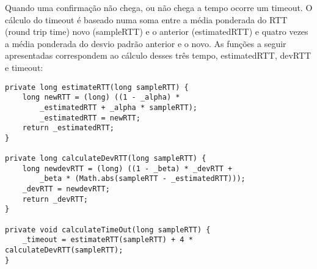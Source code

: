 \documentclass{article}
\begin{document}
Quando uma confirmação não chega, ou não chega a tempo ocorre um timeout. 
O cálculo do timeout é baseado numa soma entre a média ponderada do RTT (round trip time) novo (sampleRTT) e o anterior (estimatedRTT) e quatro vezes a média ponderada do desvio padrão anterior e o novo.
As funções a seguir apresentadas correspondem ao cálculo desses três tempo, estimatedRTT, devRTT e timeout:

\begin{lstlisting}
private long estimateRTT(long sampleRTT) {
	long newRTT = (long) ((1 - _alpha) * 
		_estimatedRTT + _alpha * sampleRTT);
		_estimatedRTT = newRTT;
	return _estimatedRTT;
}

private long calculateDevRTT(long sampleRTT) {
	long newdevRTT = (long) ((1 - _beta) * _devRTT + 
		_beta * (Math.abs(sampleRTT - _estimatedRTT)));
	_devRTT = newdevRTT;
	return _devRTT;
}

private void calculateTimeOut(long sampleRTT) {
	_timeout = estimateRTT(sampleRTT) + 4 * calculateDevRTT(sampleRTT);
}    
\end{lstlisting}


\end{document}
